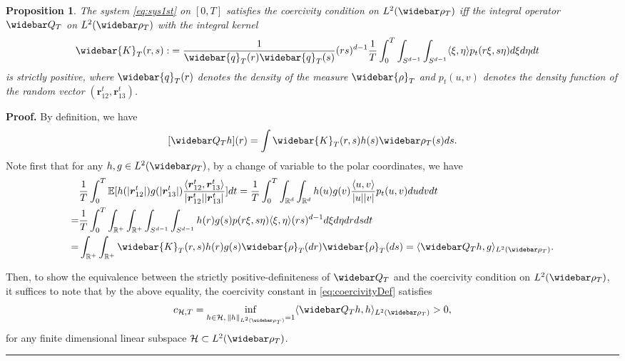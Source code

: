 \documentclass[]{elsarticle}
\def\R{\mathbb{R}}
\def\E{\mathbb{E}}
\newcommand{\wbar}\widebar
\newcommand{\mbf}[1]{\boldsymbol{#1}}
\newcommand{\innerp}[2]{\langle #1,#2 \rangle}
\newcommand{\br}{\mbf{r}}
\newcommand{\hypspace}{\mathcal{H}}
\newtheorem{proposition}[theorem]{Proposition}
\newenvironment{proof}[1][Proof]{\noindent\textbf{#1.} }{\ \rule{0.5em}{0.5em}}
\numberwithin{equation}{section}
\numberwithin{theorem}{section}
\newcommand{\ST}[1]{\textcolor{red}{{#1}}}
\begin{document}
\begin{proposition}\label{prop.cc2PD}
The system \eqref{eq:sys1st} on $[0,T]$ satisfies the coercivity condition on $L^2( \wbar\rho_T)$  iff  the integral operator $\wbar Q_T$ on $L^2(\wbar \rho_T)$  with the integral kernel 
\begin{align} \label{kernel_avg}
\widebar{K}_T(r,s): &= \frac{1}{\widebar{q}_T(r) \widebar{q}_T(s)} (rs)^{d-1}\frac{1}{T}\int_{0}^T\int_{S^{d-1}}\int_{S^{d-1}}\innerp{\xi}{\eta} p_t(r\xi,s\eta) d\xi d\eta dt 
\end{align}
is strictly positive, where $ \widebar{q}_T(r)$ denotes the density of the measure $\widebar{\rho}_T$ and $p_t(u,v)$ denotes the density function of the random vector $(\br_{12}^t, \br_{13}^t)$. 
\end{proposition}
\begin{proof} By definition, we have
\begin{align}\label{eq:Qavg}
[\wbar Q_T h] (r)= \int \wbar{K}_T(r,s) h(s) \wbar \rho_T(s)ds. 
\end{align}
Note first that  for any $h,g \in L^2(\wbar \rho_T)$, by a change of variable to the polar coordinates, we have
\begin{align}
&\frac{1}{T}\int_{0}^T  \E[h(|\br_{12}^t|)g(|\br_{13}^t|)\frac{\innerp{\br_{12}^t}{\br_{13}^t}}{|\br_{12}^t||\br_{13}^t|} ]dt
= \frac{1}{T}\int_{0}^T \int_{\R^d}\int_{\R^d} h(u)g(v) \frac{\innerp{u}{v}}{|u||v|} p_t(u,v)dudv dt \notag \\
 =& \frac{1}{T}\int_{0}^T \int_{\R^+} \int_{\R^+}   \int_{S^{d-1}}\int_{S^{d-1}} h(r)g(s) p(r\xi, s\eta) \innerp{\xi}{\eta}(rs)^{d-1}   d\xi d\eta drds dt \notag \\ 
 = & \int_{\R^+} \int_{\R^+} \widebar{K}_T(r,s) h(r) g(s)\widebar{\rho}_T(dr) \widebar{\rho}_T(ds) = \langle \wbar Q_T h, g\rangle_{L^2(\wbar \rho_T)}. \label{eq:Q&Exp} 
\end{align} 

Then, to show the equivalence between the strictly positive-definiteness of $\wbar Q_T$ and the coercivity condition on $L^2(\wbar\rho_T)$, it suffices to note that by the above equality, the coercivity constant in \eqref{eq:coercivityDef} satisfies
\[
c_{\hypspace, T} = \inf_{h\in  \mathcal{H}, \, \|h\|_{L^2(\wbar \rho_T)}=1} \langle \wbar Q_T h, h\rangle_{L^2(\wbar \rho_T)} >0,
\]
for any finite dimensional linear subspace $\mathcal{H}  \subset L^2(\wbar \rho_T)$. 
\end{proof}
\end{document}
